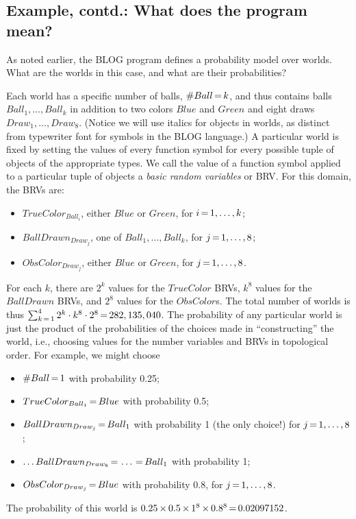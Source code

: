 \documentclass[12pt]{article}
\begin{document}
\subsection{Example, contd.: What does the program mean?}

As noted earlier, the BLOG program defines a probability model over worlds. 
What are the worlds in this case, and what are their probabilities?

Each world has a specific number of balls, $\#Ball{\,{=}\,} k$, and thus contains
balls $Ball_1,\ldots,Ball_k$ in addition to two colors $Blue$ and $Green$ and eight draws $Draw_1,\ldots,Draw_8$.
(Notice we will use italics for objects in worlds, as distinct from
typewriter font for symbols in the BLOG language.)
A particular world is fixed by setting the values of every function symbol
for every possible tuple of objects of the appropriate types. We call
the value of a function symbol applied to a particular tuple of objects
a {\em basic random variables} or BRV. For this domain, the BRVs are:
\begin{itemize}
\item $TrueColor_{Ball_i}$, either $Blue$ or $Green$, for $i{\,{=}\,}1,\ldots,k$;
\item $BallDrawn_{Draw_j}$, one of $Ball_1,\ldots,Ball_k$,  for $j{\,{=}\,}1,\ldots,8$;
\item $ObsColor_{Draw_j}$, either $Blue$ or $Green$,  for $j{\,{=}\,}1,\ldots,8$.
\end{itemize}
For each $k$, there are $2^k$ values for the $TrueColor$ BRVs,
$k^8$ values for the $BallDrawn$ BRVs, and $2^8$ values for
the $ObsColor$s. The total number of worlds is thus
$\sum_{k{\,{=}\,} 1}^4 2^k \cdot k^8 \cdot 2^8 {\,{=}\,} 282,135,040$.
The probability of any particular world is just the product of the probabilities 
of the choices made in ``constructing'' the world, i.e., choosing values
for the number variables and BRVs in topological order. For example, we might choose
\begin{itemize}
\item $\#Ball{\,{=}\,} 1$ with probability 0.25;
\item $TrueColor_{Ball_1}{\,{=}\,} Blue$ with probability 0.5;
\item $BallDrawn_{Draw_j}{\,{=}\,} Ball_1$ with probability 1 (the only choice!) for $j{\,{=}\,}1,\ldots,8$;
\item $\ldots BallDrawn_{Draw_8}{\,{=}\,} \ldots {\,{=}\,} Ball_1$ with probability 1;
\item $ObsColor_{Draw_j}{\,{=}\,} Blue$ with probability 0.8, for $j{\,{=}\,}1,\ldots,8$.
\end{itemize}
The probability of this world is $0.25 {\,\times\,} 0.5 {\,\times\,} 1^8 {\,\times\,} 0.8^8{\,{=}\,} 0.02097152$.
\end{document}
